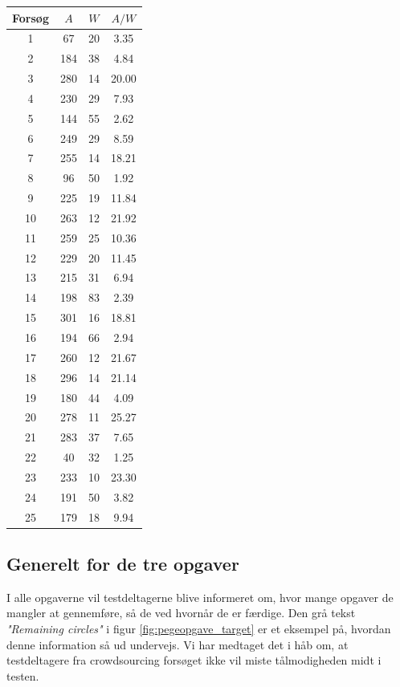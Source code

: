 \begin{minipage}[t]{.5\linewidth}
\centering
\vspace{0pt}
    \begin{tabular}{ c c c c }
        Forsøg & $A$ & $W$ & $A/W$ \\\hline
        1  & 67  & 20 & 3.35  \\
        2  & 184 & 38 & 4.84  \\
        3  & 280 & 14 & 20.00 \\
        4  & 230 & 29 & 7.93  \\
        5  & 144 & 55 & 2.62  \\
        6  & 249 & 29 & 8.59  \\
        7  & 255 & 14 & 18.21 \\
        8  & 96  & 50 & 1.92  \\
        9  & 225 & 19 & 11.84 \\
        10 & 263 & 12 & 21.92 \\
        11 & 259 & 25 & 10.36 \\
        12 & 229 & 20 & 11.45 \\
        13 & 215 & 31 & 6.94  \\
        14 & 198 & 83 & 2.39  \\
        15 & 301 & 16 & 18.81 \\
        16 & 194 & 66 & 2.94  \\
        17 & 260 & 12 & 21.67 \\
        18 & 296 & 14 & 21.14 \\
        19 & 180 & 44 & 4.09  \\
        20 & 278 & 11 & 25.27 \\
        21 & 283 & 37 & 7.65  \\
        22 & 40  & 32 & 1.25  \\
        23 & 233 & 10 & 23.30 \\
        24 & 191 & 50 & 3.82  \\
        25 & 179 & 18 & 9.94  \\\hline
    \end{tabular}
   \label{tab:pegeopgave}
\end{minipage}

\newpage
{}
\subsection*{Generelt for de tre opgaver}
I alle opgaverne vil testdeltagerne blive informeret om, hvor mange opgaver de mangler at gennemføre, så de ved hvornår de er færdige. Den grå tekst \textit{"Remaining circles"} i figur \ref{fig:pegeopgave_target} er et eksempel på, hvordan denne information så ud undervejs. Vi har medtaget det i håb om, at testdeltagere fra crowdsourcing forsøget ikke vil miste tålmodigheden midt i testen.  

